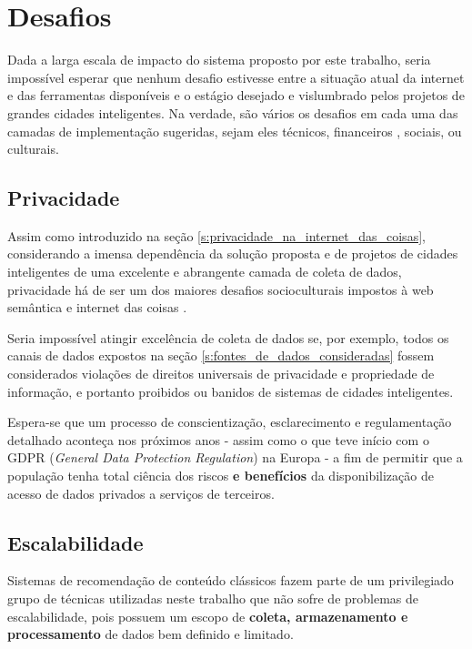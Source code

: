 \chapter{Desafios}

Dada a larga escala de impacto do sistema proposto por este trabalho, seria impossível esperar que nenhum desafio estivesse entre a situação atual da internet e das ferramentas disponíveis e o estágio desejado e vislumbrado pelos projetos de grandes cidades inteligentes. Na verdade, são vários os desafios em cada uma das camadas de implementação sugeridas, sejam eles técnicos, financeiros , sociais, ou culturais.

\section{Privacidade}

Assim como introduzido na seção \ref{s:privacidade_na_internet_das_coisas}, considerando a imensa dependência da solução proposta e de projetos de cidades inteligentes de uma excelente e abrangente camada de coleta de dados, privacidade há de ser um dos maiores desafios socioculturais impostos à web semântica e internet das coisas \cite{Kirrane2018PrivacySA}.

Seria impossível atingir excelência de coleta de dados se, por exemplo, todos os canais de dados expostos na seção \ref{s:fontes_de_dados_consideradas} fossem considerados violações de direitos universais de privacidade e propriedade de informação, e portanto proibidos ou banidos de sistemas de cidades inteligentes.

Espera-se que um processo de conscientização, esclarecimento e regulamentação detalhado aconteça nos próximos anos \cite{security:web3.0} - assim como o que teve início com o GDPR (\textit{General Data Protection Regulation}) na Europa - a fim de permitir que a população tenha total ciência dos riscos \textbf{e benefícios} da disponibilização de acesso de dados privados a serviços de terceiros.

\section{Escalabilidade}

Sistemas de recomendação de conteúdo clássicos fazem parte de um privilegiado grupo de técnicas utilizadas neste trabalho que não sofre de problemas de escalabilidade, pois possuem um escopo de \textbf{coleta, armazenamento e processamento} de dados bem definido e limitado.

